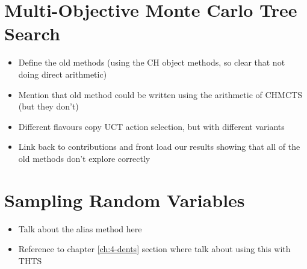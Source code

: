 \section{Multi-Objective Monte Carlo Tree Search}
\label{sec:2-4-momcts}


    \begin{itemize}
        \item Define the old methods (using the CH object methods, so clear that not doing direct arithmetic)
        \item Mention that old method could be written using the arithmetic of CHMCTS (but they don't) 
        \item Different flavours copy UCT action selection, but with different variants
        \item Link back to contributions and front load our results showing that all of the old methods don't explore correctly
    \end{itemize}

\section{Sampling Random Variables}
\label{sec:2-5-sampling}

    \begin{itemize}
        \item Talk about the alias method here
        \item Reference to chapter \ref{ch:4-dents} section where talk about using this with THTS
    \end{itemize}